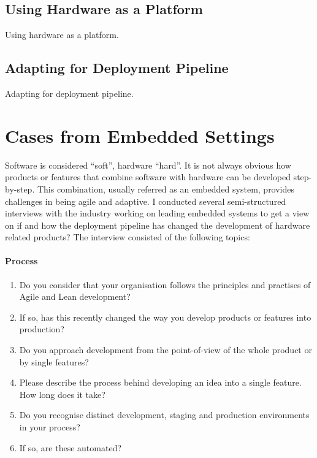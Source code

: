 \documentclass[english]{tktltiki2}
\begin{document}
\subsection{Using Hardware as a Platform}

Using hardware as a platform.

\subsection{Adapting for Deployment Pipeline}

Adapting for deployment pipeline.


\section{Cases from Embedded Settings}

Software is considered “soft”, hardware “hard”. It is not always obvious how products or features that combine software with hardware can be developed step-by-step. This combination, usually referred as an embedded system, provides challenges in being agile and adaptive. I conducted several semi-structured interviews with the industry working on leading embedded systems to get a view on if and how the deployment pipeline has changed the development of hardware related products? The interview consisted of the following topics:

\paragraph{Process}

\begin{enumerate}

    \item Do you consider that your organisation follows the principles and practises of Agile and Lean development?
    \item If so, has this recently changed the way you develop products or features into production?
    \item Do you approach development from the point-of-view of the whole product or by single features?
    \item Please describe the process behind developing an idea into a single feature. How long does it take?
    \item Do you recognise distinct development, staging and production environments in your process?
    \item If so, are these automated?

\end{enumerate}
\end{document}
